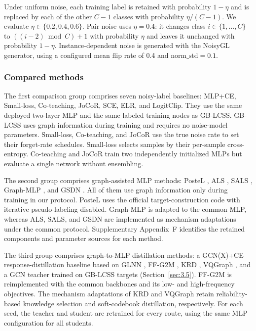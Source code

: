\documentclass[times,review,10pt]{elsarticle}
\theoremstyle{definition}
\theoremstyle{plain}
\begin{document}
Under uniform noise, each training label is retained with probability \(1-\eta\) and is replaced by each of the other \(C-1\) classes with probability \(\eta/(C-1)\). We evaluate \(\eta\in\{0.2,0.4,0.6\}\). Pair noise uses \(\eta=0.4\): it changes class \(i\in\{1,\ldots,C\}\) to \(((i-2)\bmod C)+1\) with probability \(\eta\) and leaves it unchanged with probability \(1-\eta\). Instance-dependent noise is generated with the NoisyGL generator, using a configured mean flip rate of 0.4 and \(\text{norm\_std}=0.1\).

\subsubsection{Compared methods}\label{sec:4.1.3}

The first comparison group comprises seven noisy-label baselines: MLP+CE, Small-loss, Co-teaching, JoCoR, SCE, ELR, and LogitClip. They use the same deployed two-layer MLP and the same labeled training nodes as GB-LCSS. GB-LCSS uses graph information during training and requires no noise-model parameters. Small-loss, Co-teaching, and JoCoR use the true noise rate to set their forget-rate schedules. Small-loss selects samples by their per-sample cross-entropy. Co-teaching and JoCoR train two independently initialized MLPs but evaluate a single network without ensembling.

The second group comprises graph-assisted MLP methods: PosteL \cite{ref54}, ALS \cite{ref55}, SALS \cite{ref56}, Graph-MLP \cite{ref3}, and GSDN \cite{ref40}. All of them use graph information only during training in our protocol. PosteL uses the official target-construction code with iterative pseudo-labeling disabled. Graph-MLP is adapted to the common MLP, whereas ALS, SALS, and GSDN are implemented as mechanism adaptations under the common protocol. Supplementary Appendix~F identifies the retained components and parameter sources for each method.

The third group comprises graph-to-MLP distillation methods: a GCN(X)+CE response-distillation baseline based on GLNN \cite{ref4}, FF-G2M \cite{ref45}, KRD \cite{ref46}, VQGraph \cite{ref47}, and a GCN teacher trained on GB-LCSS targets (Section~\ref{sec:3.5}). FF-G2M is reimplemented with the common backbones and its low- and high-frequency objectives. The mechanism adaptations of KRD and VQGraph retain reliability-based knowledge selection and soft-codebook distillation, respectively. For each seed, the teacher and student are retrained for every route, using the same MLP configuration for all students.
\end{document}
